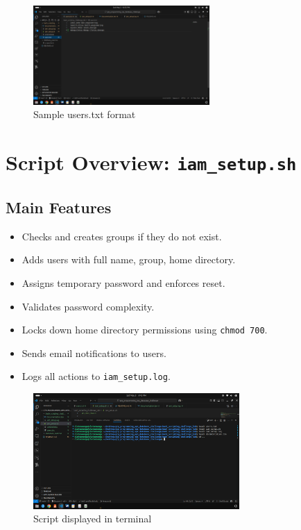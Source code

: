 \documentclass[a4paper,11pt]{article}
\begin{document}
\begin{figure}[h!]
  \centering
  \includegraphics[width=0.6\textwidth]{screenshots/users_txt_content.png}
  \caption{Sample users.txt format}
\end{figure}

\section*{\texorpdfstring{Script Overview: \texttt{iam\_setup.sh}}{Script Overview: iam_setup.sh}}



\subsection*{Main Features}
\begin{itemize}
  \item Checks and creates groups if they do not exist.
  \item Adds users with full name, group, home directory.
  \item Assigns temporary password and enforces reset.
  \item Validates password complexity.
  \item Locks down home directory permissions using \texttt{chmod 700}.
  \item Sends email notifications to users.
  \item Logs all actions to \texttt{iam\_setup.log}.

\end{itemize}

\begin{figure}[h!]
  \centering
  \includegraphics[width=0.7\textwidth]{screenshots/script_in_terminal.png}
  \caption{Script displayed in terminal}
\end{figure}
\end{document}
